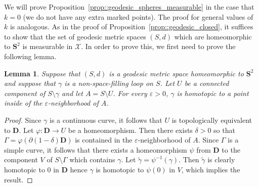 \documentclass[10pt]{amsart}
\let\mathcal\mathscr
\let\epsilon\varepsilon
\theoremstyle{plain}
\numberwithin{theorem}{section}
\newtheorem{lemma}[theorem]{Lemma}
\theoremstyle{definition}
\newcommand{\D}{\mathbf{D}}
\renewcommand{\S}{{\mathbf S}}
\newcommand{\gh}{{\mathcal X}}
\let\wt\widetilde
\begin{document}
We will prove Proposition~\ref{prop::geodesic_spheres_measurable} in the case that $k = 0$ (\ie we do not have any extra marked points). The proof for general values of $k$ is analogous. As in the proof of Proposition~\ref{prop::geodesic_closed}, it suffices to show that the set of geodesic metric spaces $(S,d)$ which are homeomorphic to $\S^2$ is measurable in $\gh$. In order to prove this, we first need to prove the following lemma.

\begin{lemma}
\label{lem::sphere_contract}
Suppose that $(S,d)$ is a geodesic metric space homeomorphic to $\S^2$ and suppose that $\gamma$ is a non-space-filling loop on $S$. Let $U$ be a connected component of $S \setminus \gamma$ and let $A = S \setminus U$. For every $\epsilon > 0$, $\gamma$ is homotopic to a point inside of the $\epsilon$-neighborhood of $A$.
\end{lemma}
\begin{proof}
Since $\gamma$ is a continuous curve, it follows that $U$ is topologically equivalent to $\D$. Let $\varphi \colon \D \to U$ be a homeomorphism. Then there exists $\delta > 0$ so that $\Gamma = \varphi(\partial (1-\delta) \D)$ is contained in the $\epsilon$-neighborhood of $A$. Since $\Gamma$ is a simple curve, it follows that there exists a homeomorphism $\psi$ from $\D$ to the component $V$ of $S \setminus \Gamma$ which contains $\gamma$. Let $\wt{\gamma} = \psi^{-1}(\gamma)$. Then $\wt{\gamma}$ is clearly homotopic to $0$ in $\D$ hence $\gamma$ is homotopic to $\psi(0)$ in $V$, which implies the result.
\end{proof}
\end{document}
